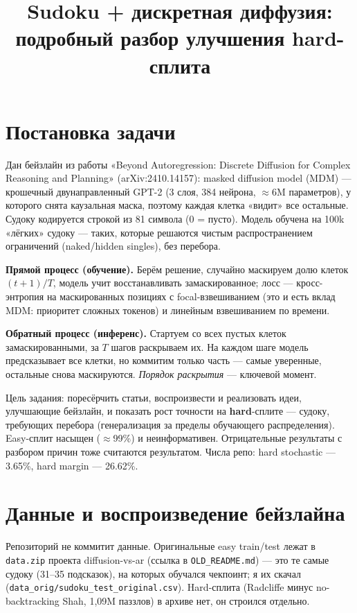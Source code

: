 \documentclass[11pt]{article}
\title{\vspace{-1.5cm}Sudoku + дискретная диффузия:\\ подробный разбор улучшения hard-сплита}
\author{}
\date{}
\newcommand{\code}[1]{\texttt{#1}}
\begin{document}
\maketitle
\vspace{-1.2cm}

\section{Постановка задачи}

Дан бейзлайн из работы «Beyond Autoregression: Discrete Diffusion for Complex Reasoning and Planning»
(arXiv:2410.14157): masked diffusion model (MDM) — крошечный двунаправленный GPT-2 (3 слоя, 384 нейрона,
$\approx$6M параметров), у которого снята каузальная маска, поэтому каждая клетка «видит» все остальные.
Судоку кодируется строкой из 81 символа (0 = пусто). Модель обучена на 100k «лёгких» судоку — таких,
которые решаются чистым распространением ограничений (naked/hidden singles), без перебора.

\textbf{Прямой процесс (обучение).} Берём решение, случайно маскируем долю клеток $(t{+}1)/T$, модель учит
восстанавливать замаскированное; лосс — кросс-энтропия на маскированных позициях с focal-взвешиванием
(это и есть вклад MDM: приоритет сложных токенов) и линейным взвешиванием по времени.

\textbf{Обратный процесс (инференс).} Стартуем со всех пустых клеток замаскированными, за $T$ шагов
раскрываем их. На каждом шаге модель предсказывает все клетки, но коммитим только часть — самые уверенные,
остальные снова маскируются. \emph{Порядок раскрытия} — ключевой момент.

Цель задания: поресёрчить статьи, воспроизвести и реализовать идеи, улучшающие бейзлайн, и показать рост
точности на \textbf{hard}-сплите — судоку, требующих перебора (генерализация за пределы обучающего
распределения). Easy-сплит насыщен ($\approx$99\%) и неинформативен. Отрицательные результаты с разбором
причин тоже считаются результатом. Числа репо: hard stochastic — 3.65\%, hard margin — 26.62\%.

\section{Данные и воспроизведение бейзлайна}

Репозиторий не коммитит данные. Оригинальные easy train/test лежат в \code{data.zip} проекта
diffusion-vs-ar (ссылка в \code{OLD_README.md}) — это те самые судоку (31–35 подсказок), на которых обучался
чекпоинт; я их скачал (\code{data_orig/sudoku_test_original.csv}). Hard-сплита (Radcliffe минус
no-backtracking Shah, 1{,}09M паззлов) в архиве нет, он строился отдельно.
\end{document}
